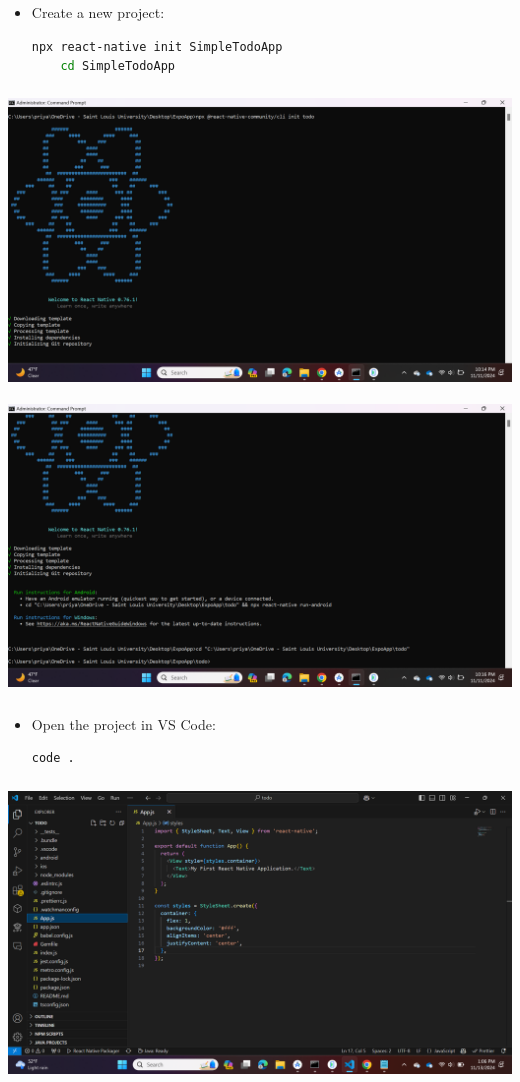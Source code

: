 \documentclass{article}
\begin{document}
\begin{itemize}
    \item Create a new project:
    \begin{lstlisting}[language=bash]
    npx react-native init SimpleTodoApp
    cd SimpleTodoApp
    \end{lstlisting}
\end{itemize}
\includegraphics[width=5.57813in,height=3.13391in]{media/image10.png}
\includegraphics[width=5.57813in,height=3.13391in]{media/image18.png}

\begin{itemize}
    \item Open the project in VS Code:
    \begin{lstlisting}[language=bash]
    code .
    \end{lstlisting}
\end{itemize}
\includegraphics[width=5.57813in,height=3.13391in]{media/image14.png}
\end{document}
